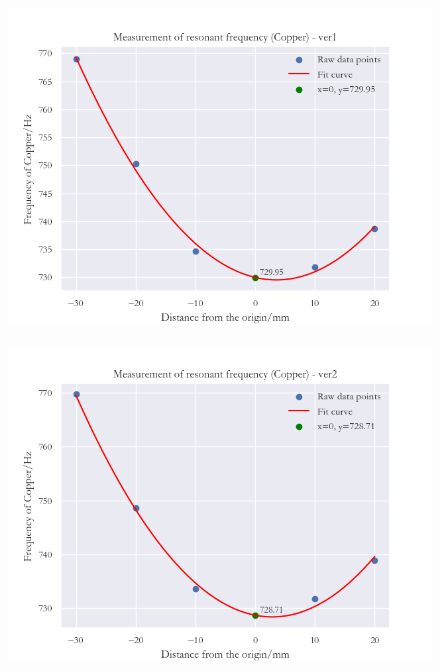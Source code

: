 \documentclass[UTF8]{article}
\begin{document}
   	 \begin{figure}[H]
         \begin{minipage}[t]{0.33\linewidth}
            \centering
            \includegraphics[clip,scale=0.35,trim={0 0 0 0}]{fig/fig8.png}
            \label{figure.11}
         \end{minipage}
         \begin{minipage}[t]{0.33\linewidth}
            \centering
            \includegraphics[clip,scale=0.35,trim={0 0 0 0}]{fig/fig9.png}
            \label{figure.12}
         \end{minipage}  
         \begin{minipage}[t]{0.33\linewidth}
         \centering

\end{minipage}
\end{figure}
\end{document}
